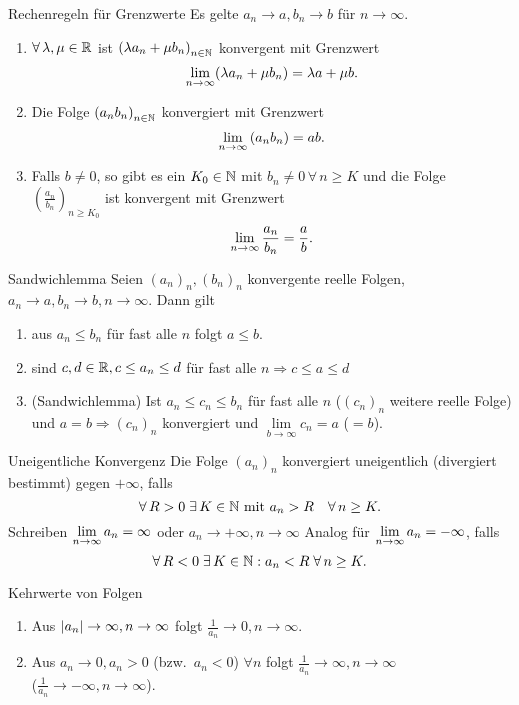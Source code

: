\documentclass[main.tex]{subfiles}
\begin{document}
\begin{karte}{Rechenregeln für Grenzwerte}
    Es gelte \(a_n\rightarrow a, b_n \rightarrow b\) 
    für \(n\rightarrow\infty \).
	\begin{enumerate}
        \item \(\forall \lambda, \mu \in\R \) ist 
        \( {(\lambda a_n + \mu b_n)}_{n\in\mathbb{N}} \) 
        konvergent mit Grenzwert 
		\[\lim\limits_{n\rightarrow\infty} (\lambda a_n + \mu b_n) = \lambda a + \mu b.\]
        \item Die Folge \( {(a_n b_n)}_{n\in\mathbb{N}} \) 
        konvergiert mit Grenzwert 
		\[\lim\limits_{n\rightarrow\infty} {(a_n b_n)} = ab.\]
        \item Falls \(b\neq 0\), so gibt es ein 
        \( K_0 \in\mathbb{N} \) mit \(b_n \neq 0 \, \forall 
        \, n\geq K\) und die Folge 
        \( {\left(\frac{a_n}{b_n}\right)}_{n\geq K_0}\) 
        ist konvergent mit Grenzwert 
		\[\lim\limits_{n\rightarrow\infty} \frac{a_n}{b_n} = \frac{a}{b}.\]
	\end{enumerate}
\end{karte}
\begin{karte}{Sandwichlemma}
    Seien \( {(a_n)}_n, {(b_n)}_n\) konvergente 
    reelle Folgen, \( a_n\rightarrow a, 
    b_n \rightarrow b, n\rightarrow\infty \). Dann gilt
	\begin{enumerate}
            \item aus \(a_n\leq b_n\) für fast alle \(n\) 
            folgt \(a\leq b\).
            \item sind \(c,d\in\mathbb{R}, c\leq a_n\leq d \) für fast alle 
            \(n \Rightarrow c\leq a\leq d\)
            \item (Sandwichlemma) Ist \(a_n \leq c_n \leq b_n \) 
            für fast alle \(n\) (\( {(c_n)}_n \) weitere reelle Folge) 
            und \( a=b \Rightarrow {(c_n)}_n \) konvergiert und 
            \( \lim\limits_{b\rightarrow\infty}c_n = a \) (\( =b \)).
	\end{enumerate}
\end{karte}
\begin{karte}{Uneigentliche Konvergenz}
    Die Folge \( {(a_n)}_n \) konvergiert 
    uneigentlich (divergiert bestimmt) 
    gegen \(+\infty \), falls 
    \[ \forall R>0 \;\exists K\in\N 
    \text{ mit } a_n >R \quad \forall n\geq K. \]
    Schreiben \( \lim\limits_{n\rightarrow\infty} a_n = \infty \) 
    oder \( a_n \rightarrow +\infty, n\rightarrow \infty \)
	Analog für \( \lim\limits_{n\rightarrow\infty} a_n = -\infty \), falls 
	\[ \forall R<0 \;\exists K\in\N: a_n < R \;\forall n\geq K. \]
\end{karte}
\begin{karte}{Kehrwerte von Folgen}
    \begin{enumerate}
        \item Aus \( \left| a_n \right| \rightarrow \infty, 
        n\rightarrow\infty \) folgt \(\frac{1}{a_n} \rightarrow 0,
        n\rightarrow\infty \).
        \item Aus \( a_n\rightarrow 0, a_n > 0 \) 
        (bzw.\  \(a_n<0\)) \( \forall n \) folgt 
        \( \frac{1}{a_n} \rightarrow\infty, 
        n\rightarrow\infty \) \\
        (\( \frac{1}{a_n} 
        \rightarrow -\infty, n\rightarrow\infty \)).
	\end{enumerate}
\end{karte}
\end{document}
